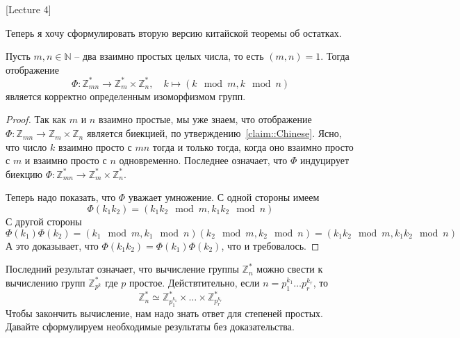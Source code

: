 [Lecture 4]


Теперь я хочу сформулировать вторую версию китайской теоремы об остатках.

\begin{claim}
\label{claim::ChineseMult}
Пусть $m, n\in \mathbb N$ -- два взаимно простых целых числа, то есть $(m,n) = 1$. Тогда отображение
\[
\Phi \colon \mathbb Z_{mn}^* \to \mathbb Z_m^* \times \mathbb Z_n^*,\quad k\mapsto (k\!\!\mod m, k\!\!\mod n)
\]
является корректно определенным изоморфизмом групп.
\end{claim}
\begin{proof}
Так как $m$ и $n$ взаимно простые, мы уже знаем, что отображение $\Phi\colon\mathbb Z_{mn}\to \mathbb Z_m \times \mathbb Z_n$ является биекцией, по утверждению~\ref{claim::Chinese}. Ясно, что число $k$ взаимно просто с $mn$ тогда и только тогда, когда оно взаимно просто с $m$ и взаимно просто с $n$ одновременно. Последнее означает, что $\Phi$ индуцирует биекцию $\Phi\colon\mathbb Z_{mn}^*\to \mathbb Z_m^* \times \mathbb Z_n^*$.

Теперь надо показать, что $\Phi$ уважает умножение.
С одной стороны имеем
\[
\Phi(k_1k_2)  = (k_1k_2\!\!\mod m, k_1k_2\!\!\mod n)
\]
С другой стороны
\[
\Phi(k_1)\Phi(k_2) = (k_1\!\!\mod m, k_1\!\!\mod n)(k_2\!\!\mod m, k_2\!\!\mod n) = (k_1k_2\!\!\mod m, k_1k_2\!\!\mod n)
\]
А это доказывает, что $\Phi(k_1k_2) = \Phi(k_1)\Phi(k_2)$, что и требовалось.
\end{proof}

Последний результат означает, что вычисление группы $\mathbb Z_n^*$ можно свести к вычислению групп $\mathbb Z_{p^k}^*$ где $p$ простое. Действтительно, если $n = p_1^{k_1}\ldots p_r^{k_r}$, то
\[
\mathbb Z_n^* \simeq \mathbb Z_{p_1^{k_1}}^*\times\ldots \times \mathbb Z_{p_r^{k_r}}^*
\]
Чтобы закончить вычисление, нам надо знать ответ для степеней простых. Давайте сформулируем необходимые результаты без доказательства.

